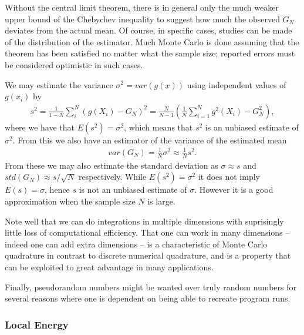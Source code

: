 \documentclass[twoside,english]{uiofysmaster}
\begin{document}
Without the central limit theorem, there is in general only the much
weaker upper bound of the Chebychev inequality to suggest how much the
observed $G_N$ deviates from the actual mean. Of course, in specific
cases, studies can be made of the distribution of the estimator. Much
Monte Carlo is done assuming that the theorem has been satisfied no
matter what the sample size; reported errors must be considered
optimistic in such cases.


We may estimate the variance $\sigma^2 = var(g(x))$ using independent values of $g(x_i)$ by
\begin{align}
	s^2 = \frac{1}{1-N} \sum_i^N (g(X_i) - G_N)^2 = \frac{N}{N-1} (  \frac{1}{N} \sum_{i=1}^N g^2(X_i) - G_N^2  ),
\end{align}
where we have that $E(s^2) = \sigma^2 $, which means that $s^2$ is an unbiased estimate of $\sigma^2$. From this we also have an estimator of the variance of the estimated mean
\begin{align}
	var(G_N) = \frac{1}{N} \sigma^2 \approx \frac{1}{N} s^2.
\end{align}
From these we may also estimate the standard deviation as $\sigma \approx s$ and $std(G_N) \approx s/\sqrt{N}$ respectively. While $E(s^2) = \sigma^2$ it does not imply $E(s) = \sigma$, hence $s$ is not an unbiased estimate of $\sigma$. However it is a good approximation when the sample size $N$ is large.

Note well that we can do integrations in multiple dimensions with
suprisingly little loss of computational efficiency. That one can work
in many dimensions – indeed one can add extra dimensions – is a
characteristic of Monte Carlo quadrature in contrast to discrete
numerical quadrature, and is a property that can be exploited to great
advantage in many applications.

Finally, pseudorandom numbers might be wanted over truly random numbers for
several reasons where one is dependent on being able to recreate
program runs.


\subsubsection{Local Energy}
\end{document}
